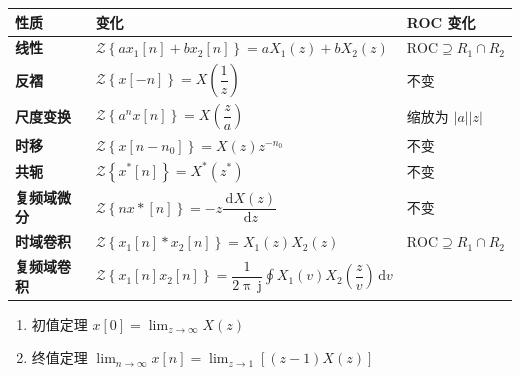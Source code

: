\documentclass[UTF8,fontset=fandol,zihao=5]{ctexart}
\newcommand{\jj}{\,\mathrm{j}}
\newcommand{\dd}{\,\mathrm{d}}
\newcommand{\zf}{\mathcal{Z}}
\begin{document}
\begin{table}[H]
  \centering
  \begin{tabularx}{\textwidth}{
    >{\bfseries}p{2cm}
    >{\centering\arraybackslash}X
    >{\centering\arraybackslash}p{3.2cm}
  }
    \toprule
    性质 & 变化 & ROC 变化 \\
    \midrule
    线性
    & $\zf\left\{a x_1[n]+b x_2[n]\right\}=aX_1(z)+bX_2(z)$
    & $\text{ROC} \supseteq R_1 \cap R_2$ \\

    反褶
    & $\zf\left\{x[-n]\right\}=X\left(\dfrac{1}{z}\right)$
    & 不变 \\

    尺度变换
    & $\zf\left\{a^n x[n]\right\}=X\left(\dfrac{z}{a}\right)$
    & 缩放为 $|a||z|$ \\

    时移
    & $\zf\left\{x[n-n_0]\right\}=X(z)z^{-n_0}$
    & 不变 \\

    共轭
    & $\zf\left\{x^*[n]\right\}=X^*(z^*)$
    & 不变 \\

    复频域微分
    & $\zf\left\{nx*[n]\right\}=-z\dfrac{\dd X(z)}{\dd z}$
    & 不变 \\

    时域卷积
    & $\zf\left\{x_1[n]*x_2[n]\right\}=X_1(z)X_2(z)$
    & $\text{ROC} \supseteq R_1 \cap R_2$ \\

    复频域卷积
    & $\displaystyle\zf\left\{x_1[n]x_2[n]\right\}=\dfrac{1}{2\uppi\jj} \oint X_1(v)X_2\left(\dfrac{z}{v}\right)\dd v$
    &  \\
    \bottomrule
  \end{tabularx}
\end{table}

\begin{enumerate}
  \item 初值定理 $\displaystyle x[0]=\lim_{z\to\infty}X(z)$
  \item 终值定理 $\displaystyle\lim_{n\to\infty}x[n]=\lim_{z\to 1}[(z-1)X(z)]$
\end{enumerate}
\end{document}
